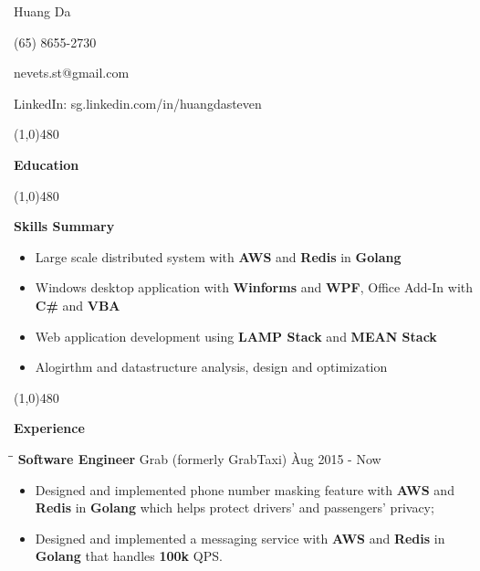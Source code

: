 \documentclass{article}
\begin{document}
\centerline{{\Huge \sc Huang Da} }
\centerline{(65) 8655-2730}
\centerline{nevets.st@gmail.com}
\centerline{LinkedIn: sg.linkedin.com/in/huangdasteven}

\noindent

\centerline{\line(1,0){480}}

\medskip

\centerline {\Large \bf Education}

\smallskip


\centerline{\line(1,0){480}}

\medskip

\centerline {\Large \bf {Skills Summary}}

\vspace{-6pt}\smallskip

\begin{itemize}[leftmargin=*]
  \item Large scale distributed system with {\bf AWS} and {\bf Redis} in {\bf Golang} \vspace{-6pt}
  \item Windows desktop application with {\bf Winforms} and {\bf WPF}, Office Add-In with {\bf C\#}  and {\bf VBA}\vspace{-6pt}
  \item Web application development using {\bf LAMP Stack} and {\bf MEAN Stack} \vspace{-6pt}
  \item Alogirthm and datastructure analysis, design and optimization \vspace{-6pt}
\end{itemize}

\centerline{\line(1,0){480}}

\medskip

\centerline {\Large \bf Experience}

\medskip


\begin{tabbing}
\hspace{2.35in}\= \hspace{2.6in}\= \kill
{\bf Software Engineer} \> Grab (formerly GrabTaxi) \`Aug 2015 - Now\
\end{tabbing}

\begin{itemize}
    \item Designed and implemented phone number masking feature with {\bf AWS} and {\bf Redis} in {\bf Golang} which helps protect drivers' and passengers' privacy; \vspace{-6pt}
    \item Designed and implemented a messaging service with {\bf AWS} and {\bf Redis} in {\bf Golang} that handles {\bf 100k} QPS.
\end{itemize}
\end{document}
